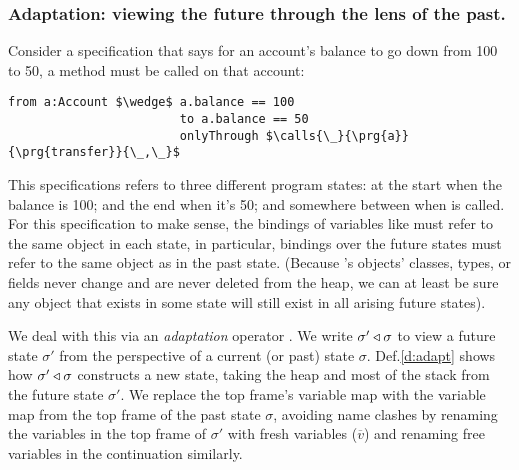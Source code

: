 \subsubsection{Adaptation: viewing the future through the lens of the past.}
%
%
Consider a specification that says for an account's balance to go down
from 100 to 50, a  method must be called on that account:
%
%

\begin{lstlisting}[language = Chainmail, mathescape=true, frame=lines]
                    from a:Account $\wedge$ a.balance == 100
                        to a.balance == 50
                        onlyThrough $\calls{\_}{\prg{a}}{\prg{transfer}}{\_,\_}$
\end{lstlisting}
%
%
%
%
This specifications refers to three different program states: at
the start when the balance is 100; and the end when it's 50; and
somewhere between when  is called.  For this
specification to make sense, the bindings of variables like 
must refer to the same object in each state, in particular, bindings
over the future states must refer to the same object as in the past
state. (Because \Loo's objects' classes, types, or fields never change
and are never deleted from the heap, we can at least be sure any
object that exists in some state will still exist in all arising future
states).

  We deal with this via an \emph{adaptation} operator \cite{FASE}. We
  write
  $\sigma' \triangleleft \sigma$
  to view a future state $\sigma'$ from the perspective of a current
  (or past) state $\sigma$. 
%  
%  
%
%
%
Def.\ref{d:adapt} shows how $\sigma' \triangleleft \sigma$ constructs a new
state, taking the heap and most of the stack from the future state 
$\sigma'$. We replace the top frame's variable map 
with the variable map from the top frame of the past state $\sigma$,
avoiding name clashes by renaming the 
variables in the top frame of $\sigma'$ with fresh variables
($\overline{v}$) and renaming free variables in the continuation similarly.


